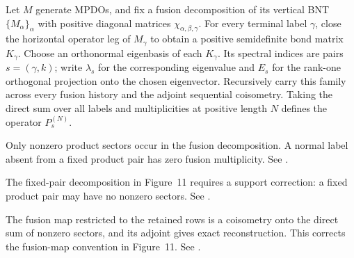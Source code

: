 \begin{definition}%
    \label{def:mpdo_fusion_clause_terminal_spectral_refinement}
    \leanok
    Let $M$ generate MPDOs, and fix a fusion decomposition of its vertical
    BNT $\{M_\alpha\}_\alpha$ with positive diagonal matrices
    $\chi_{\alpha,\beta,\gamma}$. For every terminal label $\gamma$, close the
    horizontal operator leg of $M_\gamma$ to obtain a positive semidefinite
    bond matrix $K_\gamma$. Choose an orthonormal eigenbasis of each
    $K_\gamma$. Its spectral indices are pairs $s=(\gamma,k)$; write
    $\lambda_s$ for the corresponding eigenvalue and $E_s$ for the rank-one
    orthogonal projection onto the chosen eigenvector. Recursively carry
    this family across every fusion history and the adjoint sequential
    coisometry. Taking the direct sum over all labels and multiplicities
    at positive length $N$ defines the operator $P_s^{(N)}$.

    Only nonzero product sectors occur in the fusion decomposition. A normal
    label absent from a fixed product pair has zero fusion multiplicity. See
    \cite{gap:cpsv16_bnt_uniqueness_zero_coefficient}.

    The fixed-pair decomposition in Figure~11 requires a support correction:
    a fixed product pair may have no nonzero sectors. See
    \cite{gap:cpsv16_figure11_per_pair_support}.

    The fusion map restricted to the retained rows is a coisometry onto the
    direct sum of nonzero sectors, and its adjoint gives exact reconstruction.
    This corrects the fusion-map convention in Figure~11. See
    \cite{gap:cpsv16_figure11_fusion_coisometry}.
\end{definition}

